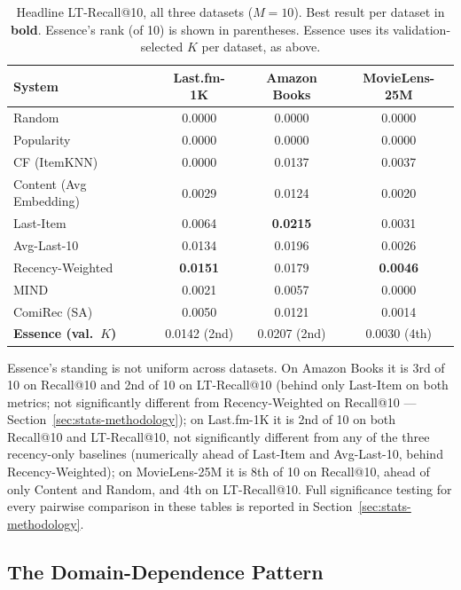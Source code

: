 \documentclass[11pt,a4paper]{article}
\begin{document}
\begin{table}[H]
\centering
\caption{Headline LT-Recall@10, all three datasets ($M=10$). Best result
         per dataset in \textbf{bold}. Essence's rank (of 10) is shown in
         parentheses. Essence uses its validation-selected $K$ per dataset,
         as above.}
\label{tab:headline-lt}
\begin{tabular}{lccc}
\toprule
\textbf{System} & \textbf{Last.fm-1K} & \textbf{Amazon Books} & \textbf{MovieLens-25M} \\
\midrule
Random                   & 0.0000 & 0.0000 & 0.0000 \\
Popularity               & 0.0000 & 0.0000 & 0.0000 \\
CF (ItemKNN)             & 0.0000 & 0.0137 & 0.0037 \\
Content (Avg Embedding)  & 0.0029 & 0.0124 & 0.0020 \\
Last-Item                & 0.0064 & \textbf{0.0215} & 0.0031 \\
Avg-Last-10              & 0.0134 & 0.0196 & 0.0026 \\
Recency-Weighted         & \textbf{0.0151} & 0.0179 & \textbf{0.0046} \\
MIND                     & 0.0021 & 0.0057 & 0.0000 \\
ComiRec (SA)             & 0.0050 & 0.0121 & 0.0014 \\
\textbf{Essence (val.\ $K$)} & 0.0142 (2nd) & 0.0207 (2nd) & 0.0030 (4th) \\
\bottomrule
\end{tabular}
\end{table}

Essence's standing is not uniform across datasets. On Amazon Books it is
3rd of 10 on Recall@10 and 2nd of 10 on LT-Recall@10 (behind only
Last-Item on both metrics; not significantly different from
Recency-Weighted on Recall@10 --- Section~\ref{sec:stats-methodology});
on Last.fm-1K it is 2nd of 10 on both Recall@10 and LT-Recall@10, not
significantly different from any of the three recency-only baselines
(numerically ahead of Last-Item and Avg-Last-10, behind Recency-Weighted);
on MovieLens-25M it is 8th of 10 on
Recall@10, ahead of only Content and Random, and 4th on LT-Recall@10.
Full significance testing for every pairwise comparison in these tables is
reported in Section~\ref{sec:stats-methodology}.

\subsection{The Domain-Dependence Pattern}
\label{sec:domain-dependence}
\end{document}
